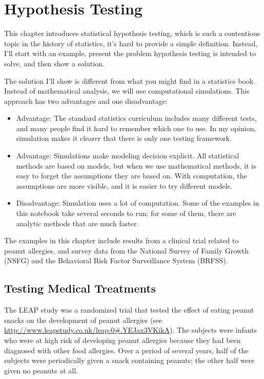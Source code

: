\hypertarget{hypothesis-testing}{%
\chapter{Hypothesis Testing}\label{hypothesis-testing}}

This chapter introduces statistical hypothesis testing, which is such a
contentious topic in the history of statistics, it's hard to provide a
simple definition. Instead, I'll start with an example, present the
problem hypothesis testing is intended to solve, and then show a
solution.

The solution I'll show is different from what you might find in a
statistics book. Instead of mathematical analysis, we will use
computational simulations. This approach has two advantages and one
disadvantage:

\begin{itemize}
\item
  Advantage: The standard statistics curriculum includes many different
  tests, and many people find it hard to remember which one to use. In
  my opinion, simulation makes it clearer that there is only one testing
  framework.
\item
  Advantage: Simulations make modeling decision explicit. All
  statistical methods are based on models, but when we use mathematical
  methods, it is easy to forget the assumptions they are based on. With
  computation, the assumptions are more visible, and it is easier to try
  different models.
\item
  Disadvantage: Simulation uses a lot of computation. Some of the
  examples in this notebook take several seconds to run; for some of
  them, there are analytic methods that are much faster.
\end{itemize}

The examples in this chapter include results from a clinical trial
related to peanut allergies, and survey data from the National Survey of
Family Growth (NSFG) and the Behavioral Risk Factor Surveillance System
(BRFSS).

\hypertarget{testing-medical-treatments}{%
\section{Testing Medical Treatments}\label{testing-medical-treatments}}

The LEAP study was a randomized trial that tested the effect of eating
peanut snacks on the development of peanut allergies (see
\url{http://www.leapstudy.co.uk/leap-0\#.YEJax3VKikA}). The subjects
were infants who were at high risk of developing peanut allergies
because they had been diagnosed with other food allergies. Over a period
of several years, half of the subjects were periodically given a snack
containing peanuts; the other half were given no peanuts at all.


